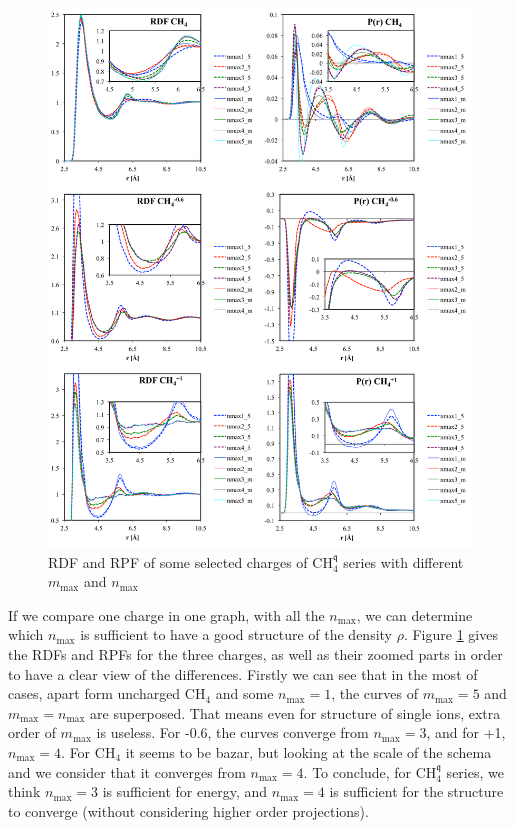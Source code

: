 \begin{figure}[!th]
\begin{centering}
\includegraphics[width=1\columnwidth]{_figure/results/ch4_series}
\par\end{centering}
\caption{\acs{RDF} and \acs{RPF} of some selected charges of $\mathrm{C}\mathrm{H}_{4}^{\mathfrak{q}}$
series with different $m_{\max}$ and $n_{\max}$\label{fig:RDF-and-polarization}}
\end{figure}

If we compare one charge in one graph, with all the $n_{\max}$, we
can determine which $n_{\max}$ is sufficient to have a good structure
of the density $\rho$. Figure \ref{fig:RDF-and-polarization} gives
the \acs{RDF}s and \acs{RPF}s for the three charges, as well as
their zoomed parts in order to have a clear view of the differences.
Firstly we can see that in the most of cases, apart form uncharged
$\mathrm{C}\mathrm{H}_{4}$ and some $n_{\max}=1$, the curves of
$m_{\max}=5$ and $m_{\max}=n_{\max}$ are superposed. That means
even for structure of single ions, extra order of $m_{\max}$ is useless.
For -0.6, the curves converge from $n_{\max}=3$, and for +1, $n_{\max}=4$.
For $\mathrm{C}\mathrm{H}_{4}$ it seems to be bazar, but looking
at the scale of the schema and we consider that it converges from
$n_{\max}=4$. To conclude, for $\mathrm{C}\mathrm{H}_{4}^{\mathfrak{q}}$
series, we think $n_{\max}=3$ is sufficient for energy, and $n_{\max}=4$
is sufficient for the structure to converge (without considering higher
order projections).


